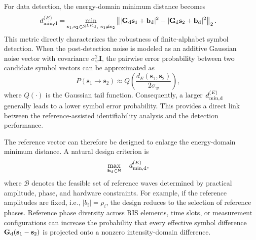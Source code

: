 \documentclass[journal]{IEEEtran}
\begin{document}
For data detection, the energy-domain minimum distance becomes
\begin{equation}
d_{\min,{\rm d}}^{(E)}
=
\min_{\mathbf{s}_1,\mathbf{s}_2\in\mathcal{S}^{LK_{\rm d}},\ \mathbf{s}_1\neq\mathbf{s}_2}
\left\|
|\mathbf{G}_{\rm d}\mathbf{s}_1+\mathbf{b}_{\rm d}|^2
-
|\mathbf{G}_{\rm d}\mathbf{s}_2+\mathbf{b}_{\rm d}|^2
\right\|_2.
\label{eq:data_energy_domain_min_distance}
\end{equation}
This metric directly characterizes the robustness of finite-alphabet symbol detection. 
When the post-detection noise is modeled as an additive Gaussian noise vector with covariance $\sigma_w^2\mathbf{I}$, the pairwise error probability between two candidate symbol vectors can be approximated as
\begin{equation}
P(\mathbf{s}_1\rightarrow\mathbf{s}_2)
\approx
Q\left(
\frac{
d_E(\mathbf{s}_1,\mathbf{s}_2)
}{
2\sigma_w
}
\right),
\label{eq:pairwise_error_probability}
\end{equation}
where $Q(\cdot)$ is the Gaussian tail function. 
Consequently, a larger $d_{\min,{\rm d}}^{(E)}$ generally leads to a lower symbol error probability. 
This provides a direct link between the reference-assisted identifiability analysis and the detection performance.

The reference vector can therefore be designed to enlarge the energy-domain minimum distance. 
A natural design criterion is
\begin{equation}
\max_{\mathbf{b}_{\rm d}\in\mathcal{B}}
\quad
d_{\min,{\rm d}}^{(E)},
\label{eq:reference_design_dmin}
\end{equation}
where $\mathcal{B}$ denotes the feasible set of reference waves determined by practical amplitude, phase, and hardware constraints. 
For example, if the reference amplitudes are fixed, i.e., $|b_i|=\rho_i$, the design reduces to the selection of reference phases. 
Reference phase diversity across RIS elements, time slots, or measurement configurations can increase the probability that every effective symbol difference $\mathbf{G}_{\rm d}(\mathbf{s}_1-\mathbf{s}_2)$ is projected onto a nonzero intensity-domain difference.
\end{document}
